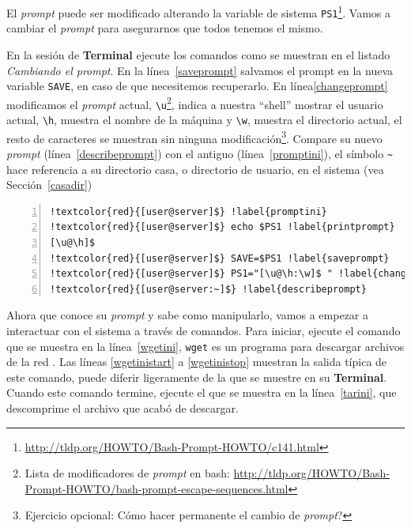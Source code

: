 \documentclass[letter,11pt]{book}
\begin{document}
El \textit{prompt} puede ser modificado alterando la variable de sistema \Verb+PS1+\footnote{\url{http://tldp.org/HOWTO/Bash-Prompt-HOWTO/c141.html}}. Vamos a cambiar el \textit{prompt} para asegurarnos que todos tenemos el mismo.

En la sesión de \textbf{Terminal} ejecute los comandos como se muestran en el listado \textit{Cambiando el prompt}. En la línea~\ref{saveprompt} salvamos el prompt en la nueva variable \Verb+SAVE+, en caso de que necesitemos recuperarlo. En línea\ref{changeprompt} modificamos el \textit{prompt} actual, \Verb+\u+\footnote{Lista de modificadores de \textit{prompt} en bash: \url{http://tldp.org/HOWTO/Bash-Prompt-HOWTO/bash-prompt-escape-sequences.html}}, indica a nuestra ``shell'' mostrar el usuario actual, \Verb+\h+, muestra el nombre de la máquina y \Verb+\w+, muestra el directorio actual, el resto de caracteres se muestran sin ninguna modificación\footnote{Ejercicio opcional: {\textquestiondown}Cómo hacer permanente el cambio de \textit{prompt}?}. Compare su nuevo \textit{prompt} (línea~\ref{describeprompt}) con el antiguo (línea~\ref{promptini}), el símbolo \Verb+~+ hace referencia a su directorio casa, o directorio de usuario, en el sistema (vea Sección~\ref{casadir})

\begin{Verbatim}[commandchars=!\{\},numbers=left,label=Cambiando el prompt,frame=topline,fontsize=\scriptsize]
!textcolor{red}{[user@server]$} !label{promptini}
!textcolor{red}{[user@server]$} echo $PS1 !label{printprompt}
[\u@\h]$
!textcolor{red}{[user@server]$} SAVE=$PS1 !label{saveprompt}
!textcolor{red}{[user@server]$} PS1="[\u@\h:\w]$ " !label{changeprompt}
!textcolor{red}{[user@server:~]$} !label{describeprompt}
\end{Verbatim} 

Ahora que conoce su \textit{prompt} y sabe como manipularlo, vamos a empezar a interactuar con el sistema a través de comandos. Para iniciar, ejecute el comando que se muestra en la línea~\ref{wgetini}, \Verb+wget+ es un programa para descargar archivos de la red . Las líneas \ref{wgetinistart} a \ref{wgetinistop} muestran la salida típica de este comando, puede diferir ligeramente de la que se muestre en su \textbf{Terminal}. Cuando este comando termine, ejecute el que se muestra en la línea~\ref{tarini}, que descomprime el archivo que acabó de descargar.
\end{document}
